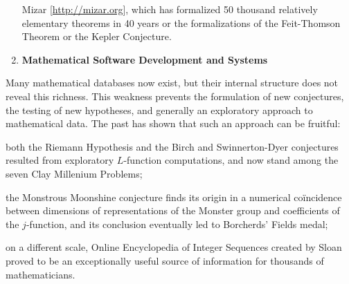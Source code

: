 \begin{enumerate}
\begin{compactenum}[a.]
    Mizar [\url{http://mizar.org}], which has formalized 50 thousand relatively elementary
    theorems in 40 years or the formalizations of the Feit-Thomson Theorem or the Kepler
    Conjecture.
  \end{compactenum}
\item \textbf{Mathematical Software Development and Systems}
\begin{draft}
\end{draft} 
\end{enumerate}
Many mathematical databases now exist, but their internal structure does not reveal this
richness. This weakness prevents the formulation of new conjectures, the testing of new
hypotheses, and generally an exploratory approach to mathematical data. The past has shown
that such an approach can be fruitful:
\begin{compactitem}
\item both the Riemann Hypothesis and the Birch and Swinnerton-Dyer conjectures resulted
  from exploratory $L$-function computations, and now stand among the seven Clay Millenium
  Problems;
\item the Monstrous Moonshine conjecture finds its origin in a numerical co\"incidence
  between dimensions of representations of the Monster group and coefficients of the
  $j$-function, and its conclusion eventually led to Borcherds' Fields medal;
\item on a different scale, Online Encyclopedia of Integer Sequences created by Sloan
proved to be an exceptionally useful source of information for thousands of mathematicians. 
\end{compactitem}


